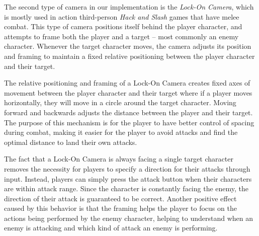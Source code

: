 The second type of camera in our implementation is the \emph{Lock-On Camera}, which is mostly used in action third-person \emph{Hack and Slash} games that have melee combat. This type of camera positions itself behind the player character, and attempts to frame both the player and a target -- most commonly an enemy character. Whenever the target character moves, the camera adjusts its position and framing to maintain a fixed relative positioning between the player character and their target.

The relative positioning and framing of a Lock-On Camera creates fixed axes of movement between the player character and their target where if a player moves horizontally, they will move in a circle around the target character. Moving forward and backwards adjusts the distance between the player and their target. The purpose of this mechanism is for the player to have better control of spacing during combat, making it easier for the player to avoid attacks and find the optimal distance to land their own attacks.

The fact that a Lock-On Camera is always facing a single target character removes the necessity for players to specify a direction for their attacks through input. Instead, players can simply press the attack button when their characters are within attack range. Since the character is constantly facing the enemy, the direction of their attack is guaranteed to be correct. Another positive effect caused by this behavior is that the framing helps the player to focus on the actions being performed by the enemy character, helping to understand when an enemy is attacking and which kind of attack an enemy is performing.

